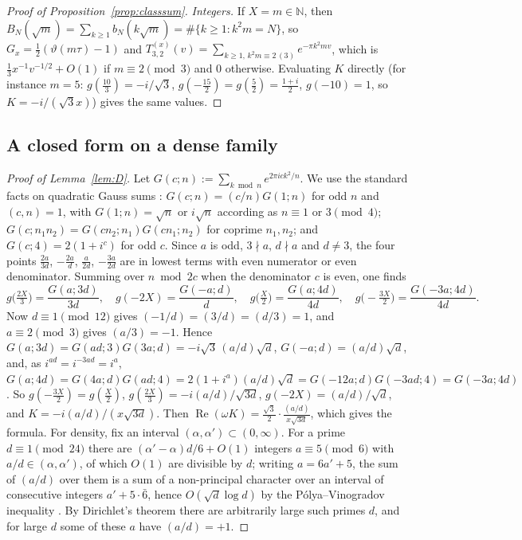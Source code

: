 \documentclass[11pt]{amsart}
\newcommand{\NN}{\mathbb N}
\renewcommand{\Re}{\operatorname{Re}}
\theoremstyle{definition}
\theoremstyle{remark}
\numberwithin{equation}{section}
\begin{document}
\begin{proof}[Proof of Proposition~\textup{\ref{prop:classsum}}]
\emph{Integers.} If $X=m\in\NN$, then $B_N(\sqrt m)=\sum_{k\ge1}b_N(k\sqrt m)=\#\{k\ge1:k^2m=N\}$, so $G_x=\frac12(\vartheta(m\tau)-1)$ and
$T^{(x)}_{3,2}(v)=\sum_{k\ge1,\,k^2m\equiv2\,(3)}e^{-\pi k^2mv}$, which is $\frac13x^{-1}v^{-1/2}+O(1)$ if $m\equiv2\pmod3$ and $0$ otherwise. Evaluating
$K$ directly (for instance $m=5$: $g(\frac{10}3)=-i/\sqrt3$, $g(-\frac{15}2)=g(\frac52)=\frac{1+i}2$, $g(-10)=1$, so $K=-i/(\sqrt3x)$) gives the same values.
\end{proof}

\subsection{A closed form on a dense family}\label{app:proofs-lemD}
\begin{proof}[Proof of Lemma~\textup{\ref{lem:D}}]
Let $G(c;n):=\sum_{k\bmod n}e^{2\pi ick^2/n}$. We use the standard facts on quadratic Gauss sums \cite[\S3.4]{IK04}: $G(c;n)=(c/n)G(1;n)$ for odd $n$ and $(c,n)=1$, with $G(1;n)=\sqrt n$ or $i\sqrt n$ according as
$n\equiv1$ or $3\pmod4$; $G(c;n_1n_2)=G(cn_2;n_1)G(cn_1;n_2)$ for coprime $n_1,n_2$; and $G(c;4)=2(1+i^c)$ for odd $c$. Since $a$ is odd,
$3\nmid a$, $d\nmid a$ and $d\ne3$, the four points $\frac{2a}{3d}$, $-\frac{2a}d$, $\frac a{2d}$, $-\frac{3a}{2d}$ are in lowest terms with
even numerator or even denominator. Summing over $n\bmod 2c$ when the denominator $c$ is even, one finds
\[
g\big(\tfrac{2X}3\big)=\frac{G(a;3d)}{3d},\quad g(-2X)=\frac{G(-a;d)}d,\quad g\big(\tfrac X2\big)=\frac{G(a;4d)}{4d},\quad g\big(-\tfrac{3X}2\big)=\frac{G(-3a;4d)}{4d}.
\]
Now $d\equiv1\pmod{12}$ gives $(-1/d)=(3/d)=(d/3)=1$, and $a\equiv2\pmod3$ gives $(a/3)=-1$. Hence
$G(a;3d)=G(ad;3)G(3a;d)=-i\sqrt3\,(a/d)\sqrt d$, $G(-a;d)=(a/d)\sqrt d$, and, as $i^{ad}=i^{-3ad}=i^a$,
$G(a;4d)=G(4a;d)G(ad;4)=2(1+i^a)(a/d)\sqrt d=G(-12a;d)G(-3ad;4)=G(-3a;4d)$. So $g(-\frac{3X}2)=g(\frac X2)$,
$g(\frac{2X}3)=-i(a/d)/\sqrt{3d}$, $g(-2X)=(a/d)/\sqrt d$, and $K=-i(a/d)/(x\sqrt{3d})$. Then $\Re(\omega K)=\frac{\sqrt3}2\cdot\frac{(a/d)}{x\sqrt{3d}}$,
which gives the formula. For density, fix an interval $(\alpha,\alpha')\subset(0,\infty)$. For a prime $d\equiv1\pmod{24}$ there are
$(\alpha'-\alpha)d/6+O(1)$ integers $a\equiv5\pmod6$ with $a/d\in(\alpha,\alpha')$, of which $O(1)$ are divisible by $d$; writing
$a=6a'+5$, the sum of $(a/d)$ over them is a sum of a non-principal character over an interval of consecutive integers $a'+5\cdot\bar6$,
hence $O(\sqrt d\log d)$ by the P\'olya--Vinogradov inequality \cite[Ch.~12]{IK04}. By Dirichlet's theorem there are arbitrarily
large such primes $d$, and for large $d$ some of these $a$ have $(a/d)=+1$.
\end{proof}
\end{document}
